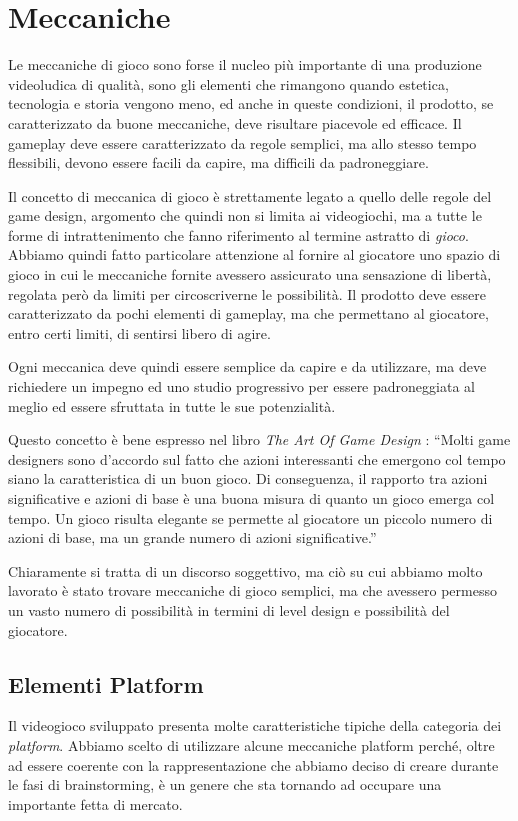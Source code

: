\section{Meccaniche}
\label{sec:meccaniche}

Le meccaniche di gioco sono forse il nucleo più importante di una produzione videoludica di qualità, sono gli elementi che rimangono quando estetica, tecnologia e storia vengono meno, ed anche in queste condizioni, il prodotto, se caratterizzato da buone meccaniche, deve risultare piacevole ed efficace.
Il gameplay deve essere caratterizzato da regole semplici, ma allo stesso tempo flessibili, devono essere facili da capire, ma difficili da padroneggiare.

Il concetto di meccanica di gioco è strettamente legato a quello delle regole del game design, argomento che quindi non si limita ai videogiochi, ma a tutte le forme di intrattenimento che fanno riferimento al termine astratto di \textit{gioco}.
Abbiamo quindi fatto particolare attenzione al fornire al giocatore uno spazio di gioco in cui le meccaniche fornite avessero assicurato una sensazione di libertà, regolata però da limiti per circoscriverne le possibilità.
Il prodotto deve essere caratterizzato da pochi elementi di gameplay, ma che permettano al giocatore, entro certi limiti, di sentirsi libero di agire.

Ogni meccanica deve quindi essere semplice da capire e da utilizzare, ma deve richiedere un impegno ed uno studio progressivo per essere padroneggiata al meglio ed essere sfruttata in tutte le sue potenzialità.

Questo concetto è bene espresso nel libro \textit{The Art Of Game Design} \cite{artOfGameDesign}:
“Molti game designers sono d’accordo sul fatto che azioni interessanti che emergono col tempo siano la caratteristica di un buon gioco. Di conseguenza, il rapporto tra azioni significative e azioni di base è una buona misura di quanto un gioco emerga col tempo. Un gioco risulta elegante se permette al giocatore un piccolo numero di azioni di base, ma un grande numero di azioni significative.”

Chiaramente si tratta di un discorso soggettivo, ma ciò su cui abbiamo molto lavorato è stato trovare meccaniche di gioco semplici, ma che avessero permesso un vasto numero di possibilità in termini di level design e possibilità del giocatore.

\subsection{Elementi Platform}
\label{platform}
Il videogioco sviluppato presenta molte caratteristiche tipiche della categoria dei \textit{platform}.
Abbiamo scelto di utilizzare alcune meccaniche platform perché, oltre ad essere coerente con la rappresentazione che abbiamo deciso di creare durante le fasi di brainstorming, è un genere che sta tornando ad occupare una importante fetta di mercato. 

